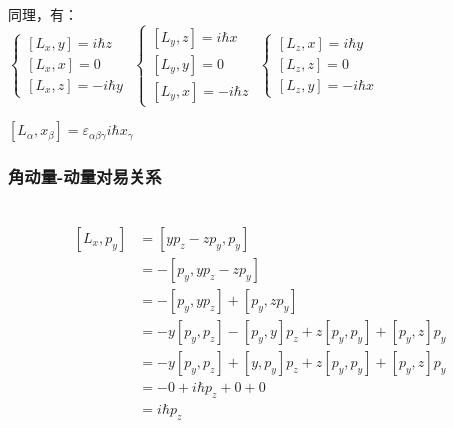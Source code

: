 \begin{frame}

    同理，有：\\
    $\begin{cases}
        [L_x,y]= i\hbar z  \\ 
        [L_x,x]= 0  \\ 
        [L_x,z]= -i\hbar y 
    \end{cases}$
    $\begin{cases}
        [L_y,z]= i\hbar x  \\ 
        [L_y,y]= 0  \\ 
        [L_y,x]= -i\hbar z 
    \end{cases}$
    $\begin{cases}
        [L_z,x]= i\hbar y  \\ 
        [L_z,z]= 0  \\ 
        [L_z,y]= -i\hbar x 
    \end{cases}$
    \begin{tcolorbox4}
        $ [L_\alpha,x_\beta]= \varepsilon_{\alpha\beta\gamma} i\hbar x_\gamma $ 
    \end{tcolorbox4}
\end{frame} 

\begin{frame}
    \frametitle{角动量-动量对易关系}
    \证~ 
    \begin{equation*}
        \begin{split}
        [L_x,p_y]&= [yp_z-zp_y,p_y]\\
        &=-[p_y,yp_z-zp_y]\\
        &=-[p_y,yp_z] + [p_y,zp_y]\\
        &=-y[p_y,p_z] -[p_y,y]p_z + z[p_y,p_y] + [p_y,z]p_y\\
        &=-y[p_y,p_z] +[y,p_y]p_z + z[p_y,p_y] + [p_y,z]p_y\\
        &=-0 + i\hbar p_z + 0+0\\
        &=i\hbar p_z \\
        \end{split}  
    \end{equation*}
\end{frame} 

